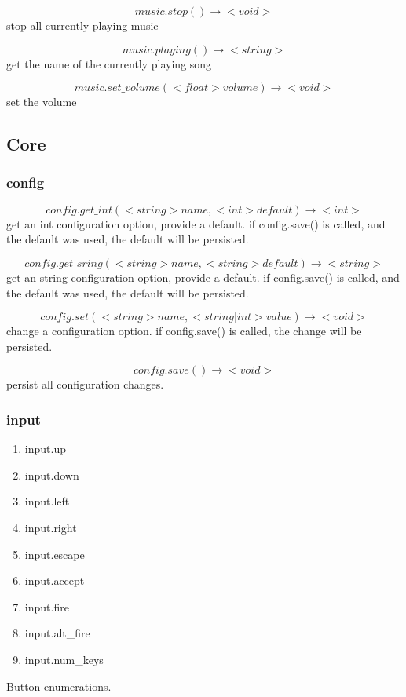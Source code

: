\documentclass[11pt,fleqn]{book} %
\begin{document}
\begin{equation}
music.stop() \rightarrow <void>
\end{equation}
stop all currently playing music

\begin{equation}
music.playing() \rightarrow <string>
\end{equation}
get the name of the currently playing song

\begin{equation}
music.set\_volume(<float> volume) \rightarrow <void>
\end{equation}
set the volume

\subsection{Core}
\subsubsection{config}
\begin{equation}
config.get\_int(<string> name, <int> default) \rightarrow <int>
\end{equation}
get an int configuration option, provide a default. if config.save() is called, and the default was used, the default will be persisted.

\begin{equation}
config.get\_sring(<string> name, <string> default) \rightarrow <string>
\end{equation}
get an string configuration option, provide a default. if config.save() is called, and the default was used, the default will be persisted.

\begin{equation}
config.set(<string> name, <string|int> value) \rightarrow <void>
\end{equation}
change a configuration option. if config.save() is called, the change will be persisted.

\begin{equation}
config.save() \rightarrow <void>
\end{equation}
persist all configuration changes.

\subsubsection{input}
\begin{enumerate}
 \item input.up
 \item input.down
 \item input.left
 \item input.right
 \item input.escape
 \item input.accept
 \item input.fire
 \item input.alt\_fire
 \item input.num\_keys
\end{enumerate}
Button enumerations.
\end{document}
